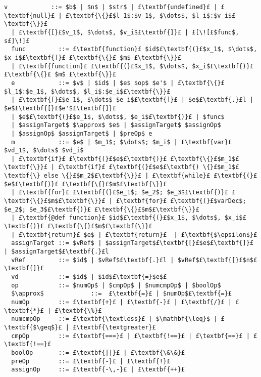 \documentclass[12pt,a4paper,twoside,openright]{report}
\theoremstyle{definition}
\theoremstyle{dotless}
\begin{document}
\begin{lstlisting}[mathescape, escapechar=£]
  v            ::= $b$ | $n$ | $str$ | £\textbf{undefined}£ | £\textbf{null}£ | £\textbf{\{}£$l_1$:$v_1$, $\dots$, $l_i$:$v_i$£\textbf{\}}£
  | £\textbf{[}£$v_1$, $\dots$, $v_i$£\textbf{]}£ | £[\![£$func$, s£]\!]£
  func         ::= £\textbf{function}£ $id$£\textbf{(}£$x_1$, $\dots$, $x_i$£\textbf{)}£ £\textbf{\{}£ $m$ £\textbf{\}}£ 
  | £\textbf{function}£ £\textbf{(}£$x_1$, $\dots$, $x_i$£\textbf{)}£ £\textbf{\{}£ $m$ £\textbf{\}}£
  e            ::= $v$ | $id$ | $e$ $op$ $e'$ | £\textbf{\{}£$l_1$:$e_1$, $\dots$, $l_i$:$e_i$£\textbf{\}}£ 
  | £\textbf{[}£$e_1$, $\dots$ $e_i$£\textbf{]}£ | $e$£\textbf{.}£l | $e$£\textbf{[}£$e'$£\textbf{]}£ 
  | $e$£\textbf{(}£$e_1$, $\dots$, $e_i$£\textbf{)}£ | $func$
  | $assignTarget$ $\approx$ $e$ | $assignTarget$ $assignOp$ 
  | $assignOp$ $assignTarget$ | $preOp$ e
  m            ::= $e$ | $m_1$; $\dots$; $m_i$ | £\textbf{var}£ $vd_1$, $\dots$ $vd_i$ 
  | £\textbf{if}£ £\textbf{(}£$e$£\textbf{)}£ £\textbf{\{}£$m_1$£\textbf{\}}£ | £\textbf{if}£ £\textbf{(}£$e$£\textbf{) \{}£$m_1$£\textbf{\} else \{}£$m_2$£\textbf{\}}£ | £\textbf{while}£ £\textbf{(}£$e$£\textbf{)}£ £\textbf{\{}£$m$£\textbf{\}}£ 
  | £\textbf{for}£ £\textbf{(}£$e_1$; $e_2$; $e_3$£\textbf{)}£ £\textbf{\{}£$m$£\textbf{\}}£ | £\textbf{for}£ £\textbf{(}£$varDec$; $e_2$; $e_3$£\textbf{)}£ £\textbf{\{}£$m$£\textbf{\}}£ 
  | £\textbf{@def function}£ $id$£\textbf{(}£$x_1$, $\dots$, $x_i$£\textbf{)}£ £\textbf{\{}£$m$£\textbf{\}}£
  | £\textbf{return}£ $e$ | £\textbf{return}£  | £\textbf{$\epsilon$}£
  assignTarget ::= $vRef$ | $assignTarget$£\textbf{[}£$e$£\textbf{]}£ | $assignTarget$£\textbf{.}£l
  vRef         ::= $id$ | $vRef$£\textbf{.}£l | $vRef$£\textbf{[}£$n$£\textbf{]}£
  vd           ::= $id$ | $id$£\textbf{=}$e$£
  op           ::= $numOp$ | $cmpOp$ | $numcmpOp$ | $boolOp$
  $\approx$             ::=  £\textbf{=}£ | $numOp$£\textbf{=}£
  numOp        ::= £\textbf{+}£ | £\textbf{-}£ | £\textbf{/}£ | £\textbf{*}£ | £\textbf{\%}£
  numcmpOp     ::= £\textbf{\textless}£ | $\mathbf{\leq}$ | £\textbf{$\geq$}£ | £\textbf{\textgreater}£
  cmpOp        ::= £\textbf{===}£ | £\textbf{!==}£ | £\textbf{==}£ | £\textbf{!==}£
  boolOp       ::= £\textbf{||}£ | £\textbf{\&\&}£
  preOp        ::= £\textbf{-}£ | £\textbf{!}£
  assignOp     ::= £\textbf{-\,-}£ | £\textbf{++}£
\end{lstlisting}
\end{document}
